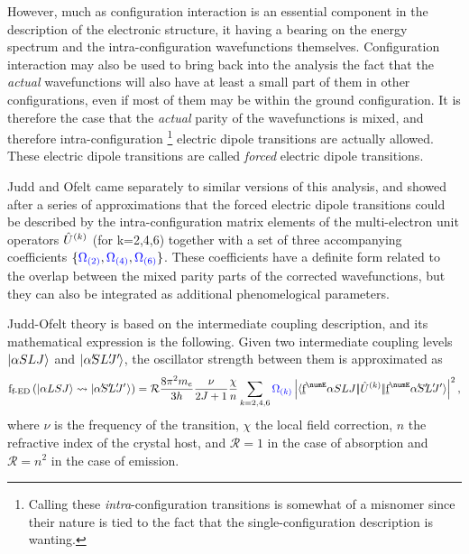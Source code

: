 \documentclass{article}
\begin{document}
However, much as configuration interaction is an essential component in the description of the electronic structure, it having a bearing on the energy spectrum and the intra-configuration wavefunctions themselves. Configuration interaction may also be used to bring back into the analysis the fact that the \textit{actual} wavefunctions will also have at least a small part of them in other configurations, even if most of them may be within the ground configuration. It is therefore the case that the \textit{actual} parity of the wavefunctions is mixed, and therefore intra-configuration \footnote{Calling these \textit{intra}-configuration transitions is somewhat of a misnomer since their nature is tied to the fact that the single-configuration description is wanting.} electric dipole transitions are actually allowed. These electric dipole transitions are called \textit{forced} electric dipole transitions.

Judd \cite{judd_optical_1962} and Ofelt \cite{ofelt_intensities_1962} came separately to similar versions of this analysis, and showed after a series of approximations that the forced electric dipole transitions could be described by the intra-configuration matrix elements of the multi-electron unit operators $\hat{U}^{(k)}$ (for k=2,4,6) together with a set of three accompanying coefficients $\{\textcolor{blue}{\Omega_{(2)}},\textcolor{blue}{\Omega_{(4)}},\textcolor{blue}{\Omega_{(6)}}\}$. These coefficients have a definite form related to the overlap between the mixed parity parts of the corrected wavefunctions, but they can also be integrated as additional phenomelogical parameters.

Judd-Ofelt theory is based on the intermediate coupling description, and its mathematical expression is the following. Given two intermediate coupling levels $|\alpha SLJ\rangle$ and $\ket{\alpha\mathrlap{'} SL\mathrlap{'}J\mathrlap{'}\,}$, the oscillator strength between them is approximated as \cite{judd_optical_1962} 
\begin{equation}
\oStrength{f-ED}{\alpha{LSJ}}{\alpha\mathrlap{'} S\mathrlap{'} L\mathrlap{'} J\mathrlap{'}\,\,} = 
	\mathcal{R} \frac{8 \pi^2 m_e}{3 h}
	\frac{\nu}{\tpo{J}}
	\frac{\chi}{n} 
	\sum_{k=2,4,6}
		\JOk{k} 
		\left|
			\redbraopket{\forb^\numE \alpha SLJ}
				{\op{U}^{(k)}}
				{\forb^\numE \alpha\mathrlap{'} S\mathrlap{'} L\mathrlap{'} J'} 
		\right|^2,
\label{eqn:forced-dipole-judd-ofelt}
\end{equation}
where $\nu$ is the frequency of the transition, $\chi$ the local field correction, $n$ the refractive index of the crystal host, and $\mathcal{R} = 1$ in the case of absorption and $\mathcal{R} = n^2$ in the case of emission. 
\end{document}
